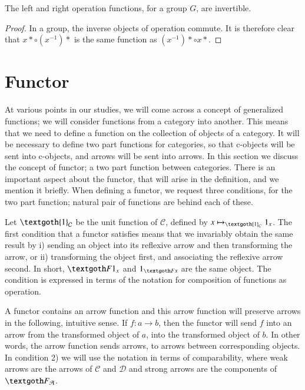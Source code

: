 \documentclass [12pt]{book}
\begin{document}
\begin{proposition}\label{prop lr can grp}The left and right operation functions, for a group $G$, are invertible.\end{proposition}

\begin{proof}In a group, the inverse objects of operation commute. It is therefore clear that $x*\circ(x^{-1})*$ is the same function as $(x^{-1})*\circ x*$.\end{proof}

	\section{Functor}

At various points in our studies, we will come across a concept of generalized functions; we will consider functions from a category into another. This means that we need to define a function on the collection of objects of a category. It will be necessary to define two part functions for categories, so that c-objects will be sent into c-objects, and arrows will be sent into arrows. In this section we discuss the concept of functor; a two part function between categories. There is an important aspect about the functor, that will arise in the definition, and we mention it briefly. When defining a functor, we request three conditions, for the two part function; natural pair of functions are behind each of these.

Let $\textgoth{1}_{\mathcal{C}}$ be the unit function of $\mathcal{C}$, defined by $x\mapsto_{\textgoth{1}_{\mathcal{C}}}1_{x}$. The first condition that a functor satisfies means that we invariably obtain the same result by i) sending an object into its reflexive arrow and then transforming the arrow, or ii) transforming the object first, and associating the reflexive arrow second. In short, $\textgoth F1_x$ and $1_{\textgoth Fx}$ are the same object. The condition is expressed in terms of the notation for composition of functions as operation.

A functor contains an arrow function and this arrow function will preserve arrows in the following, intuitive sense. If $f:a\rightarrow b$, then the functor will send $f$ into an arrow from the transformed object of $a$, into the transformed object of $b$. In other words, the arrow function sends arrows, to arrows between corresponding objects. In condition 2) we will use the notation in terms of comparability, where weak arrows are the arrows of $\mathcal C$ and $\mathcal D$ and strong arrows are the components of $\textgoth F_\mathcal A$.
\end{document}

